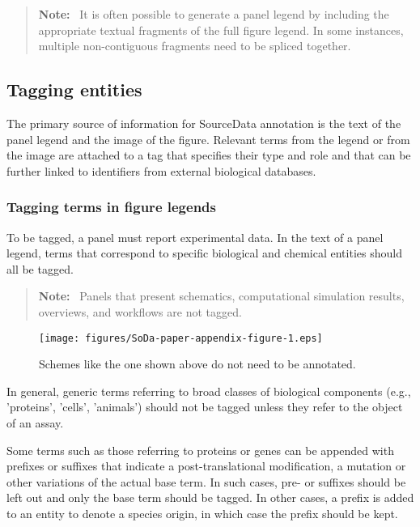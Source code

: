 \documentclass{bioinfo}
\newenvironment{note}
{\par\color{black}\begin{quote}\textbf{Note:}\ }
{\end{quote}\par}
\begin{document}
\begin{note}
    It is often possible to generate a panel legend by including the appropriate textual fragments of the full figure legend. In some instances, multiple non-contiguous fragments need to be spliced together.
\end{note}

\subsection{Tagging entities}\label{app:tagging-entities}

The primary source of information for SourceData annotation is the text of the panel legend and the image of the figure. Relevant terms from the legend or from the image are attached to a tag that specifies their type and role and that can be further linked to identifiers from external biological databases.

\subsubsection{Tagging terms in figure legends}\label{app:tagging-terms}
To be tagged, a panel must report experimental data. In the text of a panel legend, terms that correspond to specific biological and chemical entities should all be tagged.

\begin{note}
    Panels that present schematics, computational simulation results, overviews, and workflows are not tagged.
\end{note}

\begin{figure*}[ht]
    \centering
    \texttt{[image: figures/SoDa-paper-appendix-figure-1.eps]}
    \caption{Schemes like the one shown above do not need to be annotated.}
    \label{fig:scheme}
\end{figure*}

In general, generic terms referring to broad classes of biological components (e.g., 'proteins', 'cells', 'animals') should not be tagged unless they refer to the object of an assay.

Some terms such as those referring to proteins or genes can be appended with prefixes or suffixes that indicate a post-translational modification, a mutation or other variations of the actual base term. In such cases, pre- or suffixes should be left out and only the base term should be tagged. In other cases, a prefix is added to an entity to denote a species origin, in which case the prefix should be kept.
\end{document}
